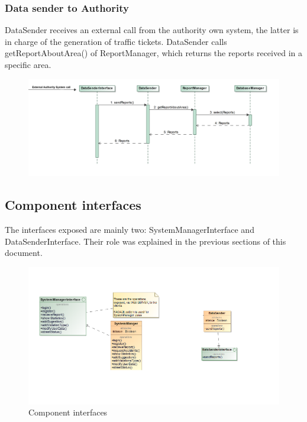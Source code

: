\subsubsection{Data sender to Authority}
DataSender receives an external call from the authority own system, the latter is in charge of the generation of traffic tickets. DataSender calls getReportAboutArea() of ReportManager, which returns the reports received in a specific area. 
\begin{figure}[H]
	\centering
	\includegraphics[width=0.9\linewidth]{Images/RunTimeDiagram/DataSender}
	\caption[Data Sender to Authority]{}
	\label{fig:datasender}
\end{figure}

\newpage

\subsection{Component interfaces}

The interfaces exposed are mainly two: SystemManagerInterface and DataSenderInterface. Their role was explained in the previous sections of this document.

\begin{figure}[H]
	\centering
	\includegraphics[width=1.12\linewidth]{Images/ComponentInterfaces.png}
	\caption{Component interfaces}
\end{figure}


